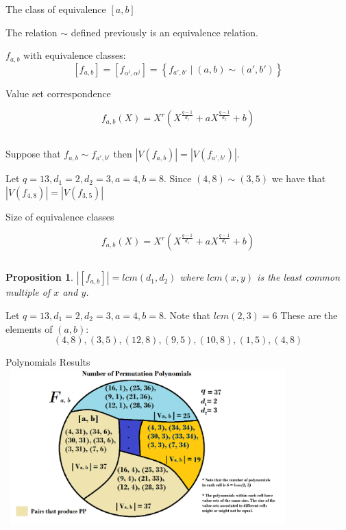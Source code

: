 \documentclass{beamer}
\newtheorem{proposition}{Proposition}
\begin{document}
\begin{frame}{The class of equivalence $[a,b]$}
  
  \begin{lemma}
    The relation $\sim$ defined previously is an equivalence relation.
  \end{lemma}

  $f_{a,b}$ with equivalence classes:
  $$ [f_{a,b}] = [f_{\alpha^i, \alpha^j}] = \left\{ f_{a',b'} \mid (a,b) \sim (a',b') \right\} $$

\end{frame}

\begin{frame}{Value set correspondence}

  {\Large $$f_{a,b}(X) = X^r(X^{\frac{q-1}{d_1}} + aX^{\frac{q-1}{d_2}} +b)$$}

  $$$$

  \begin{theorem}

    Suppose that $f_{a, b} \sim f_{a',b'}$ then $|V(f_{a, b})| = |V(f_{a', b'})|$.

  \end{theorem}

  \begin{example}
    Let $q = 13, d_1 = 2, d_2 = 3, a = 4, b = 8$. Since $(4,8) \sim (3,5)$ we have that $|V(f_{4, 8})| = |V(f_{3, 5})|$
  \end{example}

\end{frame}

\begin{frame}{Size of equivalence classes}
  
  {\Large $$f_{a,b}(X) = X^r(X^{\frac{q-1}{d_1}} + aX^{\frac{q-1}{d_2}} +b)$$}

  $$$$

  \begin{proposition}
    $|[f_{a, b}]| = lcm(d_1,d_2)$ where $lcm(x,y)$ is the least common multiple of $x$ and $y$.
  \end{proposition}

  \begin{example}
    Let $q = 13, d_1 = 2, d_2 = 3, a = 4, b = 8$. Note that $lcm(2,3) = 6$ These are the elements of $(a,b)$:
    $$ (4, 8), (3, 5), (12, 8), (9, 5), (10, 8), (1, 5), (4,8) $$
  \end{example}
\end{frame}

\begin{frame}{Polynomials Results}
  \includegraphics[width=11cm, height=6cm]{clases}
\end{frame}
\end{document}
